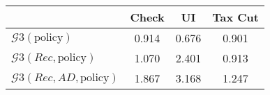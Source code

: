 \begin{tabular}{@{}lccc@{}} 
\toprule 
                          & Check      & UI    & Tax Cut    \\  \midrule 
$\mathcal{G}3(\text{policy})$ & 0.914  & 0.676  & 0.901     \\ 
$\mathcal{G}3(Rec,\text{policy})$ & 1.070  & 2.401  & 0.913     \\ 
$\mathcal{G}3(Rec, AD,\text{policy})$ & 1.867  & 3.168  & 1.247     \\ 
\end{tabular}  
